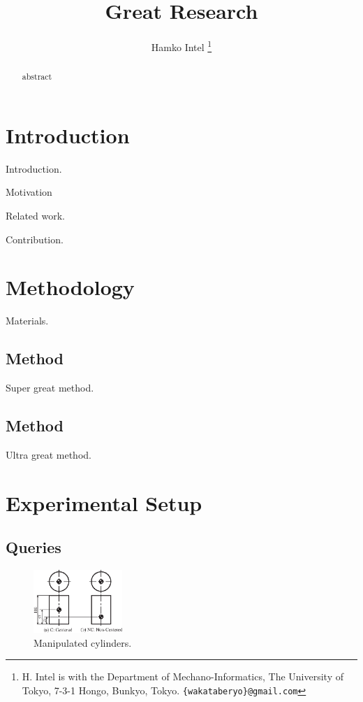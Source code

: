\documentclass[letterpaper, 10 pt, conference]{IEEEtran}  %
\title{\LARGE \bf
    Great Research
}
\author{Hamko Intel%
    \thanks{H. Intel is with the Department of Mechano-Informatics, The University of Tokyo, 7-3-1 Hongo, Bunkyo, Tokyo.  {\tt\small \{wakataberyo\}@gmail.com}}%

}
\begin{document}
\maketitle
\thispagestyle{empty}
\pagestyle{empty}

\begin{abstract}
abstract

\end{abstract}


\section{Introduction}
Introduction\cite{yingjie2005mld}.

Motivation

Related work.

Contribution.



\section{Methodology}
Materials.

\subsection{Method}
Super great method.

\subsection{Method}
Ultra great method.


\section{Experimental Setup}
\subsection{Queries}

\begin{figure}[t!]
 \centering
 \includegraphics[width=0.3\textwidth]{figure/cylinder-property.eps}
 \caption{Manipulated cylinders.} 
 \label{fig:cylinder}
\end{figure}
\end{document}
